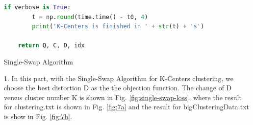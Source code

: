 \begin{description}
\begin{description}
\begin{lstlisting}[language=Python, caption=K-Centers Algorithm Python Code]
    if verbose is True:
        t = np.round(time.time() - t0, 4)
        print('K-Centers is finished in ' + str(t) + 's')

    return Q, C, D, idx
\end{lstlisting}

\end{description}

\newpage
\item[\Romannum{3}.] Single-Swap Algorithm

\begin{description}
\item{1.} In this part, with the Single-Swap Algorithm for K-Centers clustering, we choose the best distortion D as the the objection function. The change of D versus cluster number K is shown in Fig. \ref{fig:single-swap-loss}, where the result for clustering.txt is shown in Fig. \ref{fig:7a} and the result for bigClusteringData.txt is show in Fig. \ref{fig:7b}.


\end{description}
\end{description}
